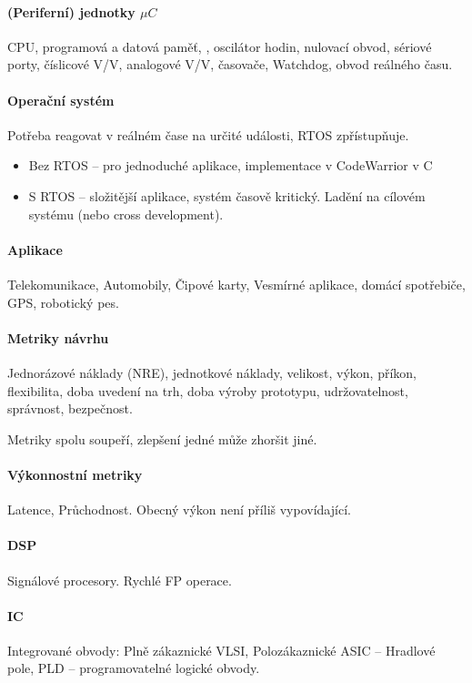 \documentclass[a4paper, 11pt]{report}
\begin{document}
\paragraph{(Periferní) jednotky $\mu C$}
CPU, programová a datová paměť, , oscilátor hodin, nulovací obvod, sériové porty, číslicové V/V, analogové V/V, časovače, Watchdog, obvod reálného času.

\paragraph{Operační systém} Potřeba reagovat v reálném čase na určité události, RTOS zpřístupňuje.
\begin{itemize}
	\item Bez RTOS -- pro jednoduché aplikace, implementace v CodeWarrior v C
	\item S RTOS -- složitější aplikace, systém časově kritický. Ladění na cílovém systému (nebo cross development).
\end{itemize}

\paragraph{Aplikace}
Telekomunikace, Automobily, Čipové karty, Vesmírné aplikace, domácí spotřebiče, GPS, robotický pes.

\paragraph{Metriky návrhu}
Jednorázové náklady (NRE), jednotkové náklady, velikost, výkon, příkon, flexibilita, doba uvedení na trh, doba výroby prototypu, udržovatelnost, správnost, bezpečnost.

Metriky spolu soupeří, zlepšení jedné může zhoršit jiné.

\paragraph{Výkonnostní metriky}
Latence, Průchodnost. Obecný výkon není příliš vypovídající.

\paragraph{DSP} Signálové procesory. Rychlé FP operace.

\paragraph{IC} Integrované obvody: Plně zákaznické VLSI, Polozákaznické ASIC -- Hradlové pole, PLD -- programovatelné logické obvody.
\end{document}
